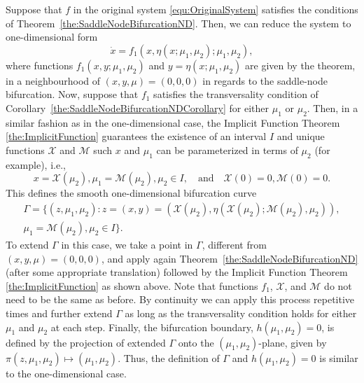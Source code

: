 \documentclass[12pt]{article}
\begin{document}
Suppose that $f$ in the original system \eqref{equ:OriginalSystem} satisfies the conditions of Theorem~\ref{the:SaddleNodeBifurcationND}. Then, we can reduce the system to one-dimensional form
\[\dot x = f_{1}(x,\eta(x;\mu_{1},\mu_{2});\mu_{1},\mu_{2}),\]
where functions $f_{1}(x,y;\mu_{1},\mu_{2})$ and $y=\eta(x;\mu_{1},\mu_{2})$ are given by the theorem, in a neighbourhood of $(x,y,\mu)=(0,0,0)$ in regards to the saddle-node bifurcation. Now, suppose that $f_{1}$ satisfies the transversality condition of Corollary~\ref{the:SaddleNodeBifurcationNDCorollary} for either $\mu_{1}$ or $\mu_{2}$. Then, in a similar fashion as in the one-dimensional case, the Implicit Function Theorem \ref{the:ImplicitFunction} guarantees the existence of an interval $I$ and unique functions $\mathcal{X}$ and $\mathcal{M}$ such $x$ and $\mu_{1}$ can be parameterized in terms of $\mu_{2}$ (for example), i.e.,
\begin{equation*}
    x=\mathcal{X}(\mu_{2}), \mu_{1}=\mathcal{M}(\mu_{2}), \mu_{2}\in I, \quad \mathrm{and}\quad  \mathcal{X}(0)=0, \mathcal{M}(0)=0.
\end{equation*}
This defines the smooth one-dimensional bifurcation curve
\begin{multline}
    \Gamma = \{ (z,\mu_{1},\mu_{2}) \colon 
    z = (x,y)=(\mathcal{X}(\mu_{2}),\eta(\mathcal{X}(\mu_{2});\mathcal{M}(\mu_{2}),\mu_{2})), \\ \mu_{1} = \mathcal{M}(\mu_{2}), \mu_{2}\in I \}.
\end{multline}
To extend $\Gamma$ in this case, we take a point in $\Gamma$, different from $(x,y,\mu)=(0,0,0)$, and apply again Theorem~\ref{the:SaddleNodeBifurcationND} (after some appropriate translation) followed by the Implicit Function Theorem \ref{the:ImplicitFunction} as shown above. Note that functions $f_{1}$, $\mathcal{X}$, and $\mathcal{M}$ do not need to be the same as before. By continuity we can apply this process repetitive times and further extend $\Gamma$ as long as the transversality condition holds for either $\mu_{1}$ and $\mu_{2}$ at each step. Finally, the bifurcation boundary, $h(\mu_{1},\mu_{2})=0$, is defined by the projection of extended $\Gamma$ onto the $(\mu_{1},\mu_{2})$-plane, given by $\pi(z,\mu_{1},\mu_{2})\mapsto (\mu_{1},\mu_{2})$. Thus, the definition of $\Gamma$ and $h(\mu_{1},\mu_{2})=0$ is similar to the one-dimensional case.
\end{document}
